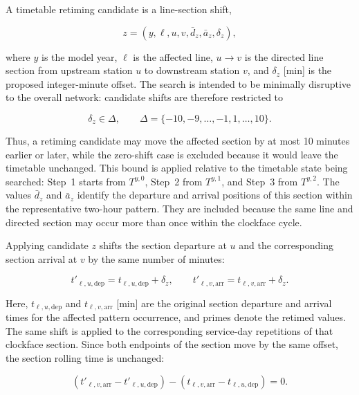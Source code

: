 \documentclass[preprint,12pt]{elsarticle}
\begin{document}
A timetable retiming candidate is a line-section shift,

\begin{equation}
z=(y,\ell,u,v,\bar d_z,\bar a_z,\delta_z),
\label{eq:part2-candidate-shift}
\end{equation}

where \(y\) is the model year, \(\ell\) is the affected line, \(u\rightarrow v\) is the directed line section from upstream station \(u\) to downstream station \(v\), and \(\delta_z\) [min] is the proposed integer-minute offset. The search is intended to be minimally disruptive to the overall network: candidate shifts are therefore restricted to

\begin{equation}
\delta_z\in\Delta,
\qquad
\Delta=\{-10,-9,\ldots,-1,1,\ldots,10\}.
\label{eq:part2-shift-domain}
\end{equation}

Thus, a retiming candidate may move the affected section by at most 10 minutes earlier or later, while the zero-shift case is excluded because it would leave the timetable unchanged. This bound is applied relative to the timetable state being searched: Step~1 starts from \(T^{y,0}\), Step~2 from \(T^{y,1}\), and Step~3 from \(T^{y,2}\). The values \(\bar d_z\) and \(\bar a_z\) identify the departure and arrival positions of this section within the representative two-hour pattern. They are included because the same line and directed section may occur more than once within the clockface cycle.

Applying candidate \(z\) shifts the section departure at \(u\) and the corresponding section arrival at \(v\) by the same number of minutes:

\begin{equation}
t'_{\ell,u,\mathrm{dep}}
=
t_{\ell,u,\mathrm{dep}}+\delta_z,
\qquad
t'_{\ell,v,\mathrm{arr}}
=
t_{\ell,v,\mathrm{arr}}+\delta_z.
\label{eq:part2-section-shift}
\end{equation}

Here, \(t_{\ell,u,\mathrm{dep}}\) and \(t_{\ell,v,\mathrm{arr}}\) [min] are the original section departure and arrival times for the affected pattern occurrence, and primes denote the retimed values. The same shift is applied to the corresponding service-day repetitions of that clockface section. Since both endpoints of the section move by the same offset, the section rolling time is unchanged:

\begin{equation}
\left(
t'_{\ell,v,\mathrm{arr}}
-
t'_{\ell,u,\mathrm{dep}}
\right)
-
\left(
t_{\ell,v,\mathrm{arr}}
-
t_{\ell,u,\mathrm{dep}}
\right)
=0.
\label{eq:part2-rolling-invariant}
\end{equation}
\end{document}
